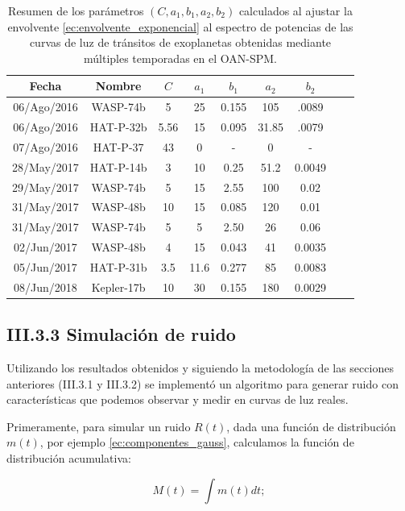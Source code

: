 \begin{table}
	\centering
	\begin{tabular}{ccccccccc}
	\hline 
	Fecha & Nombre & $C$ & $a_{1}$ & $b_{1}$ & $a_{2}$ & $b_{2}$\\ 
	\hline
	06/Ago/2016 & WASP-74b & 5 & 25 & 0.155 & 105 & .0089\\ 
	06/Ago/2016 & HAT-P-32b & 5.56 & 15 & 0.095 & 31.85 & .0079 \\
	07/Ago/2016 & HAT-P-37 & 43 & 0 & - & 0 & - \\ 
	28/May/2017 & HAT-P-14b & 3 & 10 & 0.25 & 51.2 & 0.0049 \\ 
	29/May/2017 & WASP-74b & 5 & 15 & 2.55 & 100 & 0.02 \\
  31/May/2017 & WASP-48b & 10 & 15 & 0.085 & 120 & 0.01\\  
	31/May/2017 & WASP-74b & 5 & 5 & 2.50 & 26 & 0.06 \\
	02/Jun/2017 & WASP-48b & 4 & 15 & 0.043 & 41 & 0.0035 \\ 
	05/Jun/2017 & HAT-P-31b & 3.5 & 11.6 & 0.277 & 85 & 0.0083 \\
	08/Jun/2018 & Kepler-17b & 10 & 30 & 0.155 & 180 & 0.0029\\ 
	\hline  
	\end{tabular} 
	\caption{Resumen de los parámetros $(C,a_{1},b_{1},a_{2},b_{2})$ calculados al ajustar la envolvente \ref{ec:envolvente_exponencial} al espectro de potencias de las curvas de luz de tránsitos de exoplanetas obtenidas mediante múltiples temporadas en el OAN-SPM.}
	\label{tab:parametros_exponencial}
	\end{table}





\subsection*{III.3.3 Simulación de ruido}

Utilizando los resultados obtenidos y siguiendo la metodología de las secciones anteriores (III.3.1 y III.3.2) se implementó un algoritmo para generar ruido con características que podemos observar y medir en curvas de luz reales.

Primeramente, para simular un ruido $R(t)$, dada una función de distribución $m(t)$, por ejemplo \ref{ec:componentes_gauss}, calculamos la función de distribución acumulativa:

\begin{equation}\label{ec:distribucion_acumulada}
  \displaystyle M(t)= \int m(t)dt;
\end{equation}

